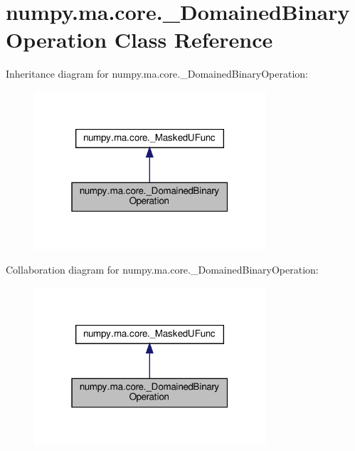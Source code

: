 \hypertarget{classnumpy_1_1ma_1_1core_1_1__DomainedBinaryOperation}{}\section{numpy.\+ma.\+core.\+\_\+\+Domained\+Binary\+Operation Class Reference}
\label{classnumpy_1_1ma_1_1core_1_1__DomainedBinaryOperation}


Inheritance diagram for numpy.\+ma.\+core.\+\_\+\+Domained\+Binary\+Operation\+:
\nopagebreak
\begin{figure}[H]
\begin{center}
\leavevmode
\includegraphics[width=244pt]{classnumpy_1_1ma_1_1core_1_1__DomainedBinaryOperation__inherit__graph}
\end{center}
\end{figure}


Collaboration diagram for numpy.\+ma.\+core.\+\_\+\+Domained\+Binary\+Operation\+:
\nopagebreak
\begin{figure}[H]
\begin{center}
\leavevmode
\includegraphics[width=244pt]{classnumpy_1_1ma_1_1core_1_1__DomainedBinaryOperation__coll__graph}
\end{center}
\end{figure}

